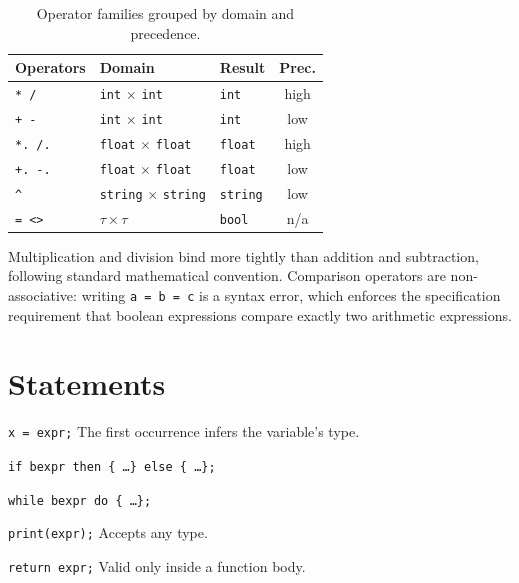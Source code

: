 \documentclass[12pt,a4paper]{report}
\newcommand{\tint}{\texttt{int}}
\newcommand{\tfloat}{\texttt{float}}
\newcommand{\tbool}{\texttt{bool}}
\newcommand{\tstring}{\texttt{string}}
\begin{document}
\begin{table}[H]
\centering
\caption{Operator families grouped by domain and precedence.}
\label{tab:operators}
\begin{tabular}{@{} l l l c @{}}
\toprule
\textbf{Operators} & \textbf{Domain} & \textbf{Result} & \textbf{Prec.} \\
\midrule
\texttt{*}~\texttt{/}     & \tint{} $\times$ \tint{}       & \tint    & high \\
\texttt{+}~\texttt{-}     & \tint{} $\times$ \tint{}       & \tint    & low \\
\texttt{*.}~\texttt{/.}   & \tfloat{} $\times$ \tfloat{}   & \tfloat  & high \\
\texttt{+.}~\texttt{-.}   & \tfloat{} $\times$ \tfloat{}   & \tfloat  & low \\
\texttt{\^{}}              & \tstring{} $\times$ \tstring{} & \tstring & low \\
\texttt{=}~\texttt{<>}    & $\tau \times \tau$              & \tbool   & n/a \\
\bottomrule
\end{tabular}
\end{table}

Multiplication and division bind more tightly than addition and subtraction,
following standard mathematical convention. Comparison operators are
non-associative: writing \texttt{a = b = c} is a syntax error, which enforces
the specification requirement that boolean expressions compare exactly two
arithmetic expressions.

\section{Statements}

\begin{description}[style=nextline, leftmargin=2.5cm, labelwidth=2.3cm]
  \item[Assignment] \texttt{x = expr;}
        \hfill The first occurrence infers the variable's type.
  \item[If-then-else] \texttt{if bexpr then \{ \ldots \} else \{ \ldots \};}
  \item[While] \texttt{while bexpr do \{ \ldots \};}
  \item[Print] \texttt{print(expr);}
        \hfill Accepts any type.
  \item[Return] \texttt{return expr;}
        \hfill Valid only inside a function body.
\end{description}
\end{document}
